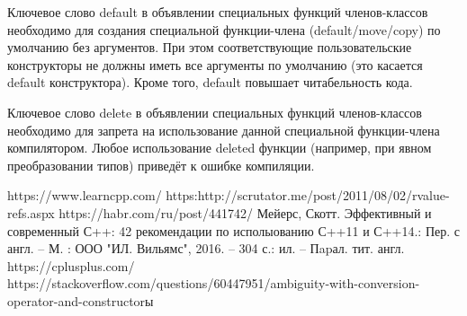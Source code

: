\documentclass[a4paper,12pt]{article}	%
\begin{document}
	Ключевое слово default в объявлении специальных функций членов-классов необходимо для создания специальной функции-члена (default/move/copy) по умолчанию без аргументов. При этом соответствующие пользовательские конструкторы не должны иметь все аргументы по умолчанию (это касается default конструктора). Кроме того, default повышает читабельность кода.
	
	Ключевое слово delete в объявлении специальных функций членов-классов необходимо для запрета на использование данной специальной функции-члена компилятором. Любое использование deleted функции (например, при явном преобразовании типов) приведёт к ошибке компиляции.

\newpage

 
\begin{thebibliography}{}
     https://www.learncpp.com/
     https:http://scrutator.me/post/2011/08/02/rvalue-refs.aspx
     https://habr.com/ru/post/441742/
	 Мейерс, Скотт. Эффективный и современный С++: 42 рекомендации по исполыованию С++11 и С++14.: Пер. с англ. -- М. : ООО "ИЛ. Вильямс", 2016. -- 304 с.: ил. -- Пapал. тит. англ.
	 https://cplusplus.com/
	 https://stackoverflow.com/questions/60447951/ambiguity-with-conversion-operator-and-constructorы
    
\end{thebibliography}
\end{document}
